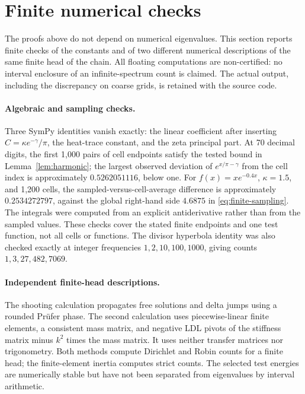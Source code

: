\section{Finite numerical checks}
\label{sec:checks}

The proofs above do not depend on numerical eigenvalues.
This section reports finite checks of the constants and of
two different numerical descriptions of the same finite
head of the chain.
All floating computations are non-certified: no interval
enclosure of an infinite-spectrum count is claimed.
The actual output, including the discrepancy on coarse
grids, is retained with the source code.

\paragraph{Algebraic and sampling checks.}
Three SymPy identities vanish exactly: the linear
coefficient after inserting $C=\kappa e^{-\gamma}/\pi$,
the heat-trace constant, and the zeta principal part.
At 70 decimal digits, the first 1,000 pairs of cell
endpoints satisfy the tested bound in
Lemma~\ref{lem:harmonic}; the largest observed deviation
of $e^{x/\pi-\gamma}$ from the cell index is approximately
$0.5262051116$, below one.
For $f(x)=xe^{-0.4x}$, $\kappa=1.5$, and 1,200
cells, the sampled-versus-cell-average difference is
approximately $0.2534272797$, against the global
right-hand side $4.6875$ in
\eqref{eq:finite-sampling}.
The integrals were computed from an explicit
antiderivative rather than from the sampled values.
These checks cover the stated finite endpoints and one
test function, not all cells or functions.
The divisor hyperbola identity was also checked exactly
at integer frequencies $1,2,10,100,1000$, giving counts
$1,3,27,482,7069$.

\paragraph{Independent finite-head descriptions.}
The shooting calculation propagates free solutions and
delta jumps using a rounded Pr\"ufer phase.
The second calculation uses piecewise-linear finite
elements, a consistent mass matrix, and negative LDL
pivots of the stiffness matrix minus $k^2$ times the
mass matrix.
It uses neither transfer matrices nor trigonometry.
Both methods compute Dirichlet and Robin counts for a
finite head; the finite-element inertia computes strict
counts.
The selected test energies are numerically stable but
have not been separated from eigenvalues by interval
arithmetic.

